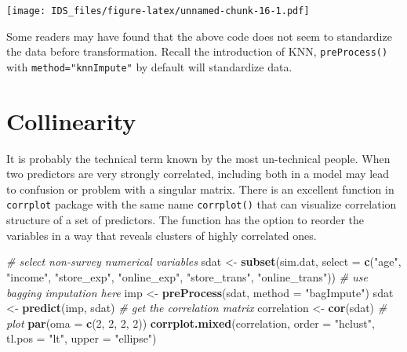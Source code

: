\documentclass[12pt,]{krantz}
\makeatletter
\newenvironment{Shaded}{\begin{snugshade}}{\end{snugshade}}
\newcommand{\CommentTok}[1]{\textcolor[rgb]{0.37,0.37,0.37}{\textit{#1}}}
\newcommand{\DataTypeTok}[1]{\textcolor[rgb]{0.27,0.27,0.27}{#1}}
\newcommand{\DecValTok}[1]{\textcolor[rgb]{0.06,0.06,0.06}{#1}}
\newcommand{\KeywordTok}[1]{\textcolor[rgb]{0.27,0.27,0.27}{\textbf{#1}}}
\newcommand{\NormalTok}[1]{#1}
\newcommand{\StringTok}[1]{\textcolor[rgb]{0.5,0.5,0.5}{#1}}
\newenvironment{kframe}{%
\medskip{}
\setlength{\fboxsep}{.8em}
 \def\at@end@of@kframe{}%
 \ifinner\ifhmode%
  \def\at@end@of@kframe{\end{minipage}}%
  \begin{minipage}{\columnwidth}%
 \fi\fi%
 \def\FrameCommand##1{\hskip\@totalleftmargin \hskip-\fboxsep
 \colorbox{shadecolor}{##1}\hskip-\fboxsep
     \hskip-\linewidth \hskip-\@totalleftmargin \hskip\columnwidth}%
 \MakeFramed {\advance\hsize-\width
   \@totalleftmargin\z@ \linewidth\hsize
   \@setminipage}}%
 {\par\unskip\endMakeFramed%
 \at@end@of@kframe}
\renewenvironment{Shaded}{\begin{kframe}}{\end{kframe}}
\makeatother
\begin{document}
\texttt{[image: IDS\_files/figure-latex/unnamed-chunk-16-1.pdf]}

Some readers may have found that the above code does not seem to standardize the data before transformation. Recall the introduction of KNN, \texttt{preProcess()} with \texttt{method="knnImpute"} by default will standardize data.

\hypertarget{collinearity}{%
\section{Collinearity}\label{collinearity}}

It is probably the technical term known by the most un-technical people. When two predictors are very strongly correlated, including both in a model may lead to confusion or problem with a singular matrix. There is an excellent function in \texttt{corrplot} package with the same name \texttt{corrplot()} that can visualize correlation structure of a set of predictors. The function has the option to reorder the variables in a way that reveals clusters of highly correlated ones.

\begin{Shaded}
\begin{Highlighting}[]
\CommentTok{# select non-survey numerical variables}
\NormalTok{sdat <-}\StringTok{ }\KeywordTok{subset}\NormalTok{(sim.dat, }\DataTypeTok{select =} \KeywordTok{c}\NormalTok{(}\StringTok{"age"}\NormalTok{, }\StringTok{"income"}\NormalTok{, }\StringTok{"store_exp"}\NormalTok{, }
    \StringTok{"online_exp"}\NormalTok{, }\StringTok{"store_trans"}\NormalTok{, }\StringTok{"online_trans"}\NormalTok{))}
\CommentTok{# use bagging imputation here}
\NormalTok{imp <-}\StringTok{ }\KeywordTok{preProcess}\NormalTok{(sdat, }\DataTypeTok{method =} \StringTok{"bagImpute"}\NormalTok{)}
\NormalTok{sdat <-}\StringTok{ }\KeywordTok{predict}\NormalTok{(imp, sdat)}
\CommentTok{# get the correlation matrix}
\NormalTok{correlation <-}\StringTok{ }\KeywordTok{cor}\NormalTok{(sdat)}
\CommentTok{# plot}
\KeywordTok{par}\NormalTok{(}\DataTypeTok{oma =} \KeywordTok{c}\NormalTok{(}\DecValTok{2}\NormalTok{, }\DecValTok{2}\NormalTok{, }\DecValTok{2}\NormalTok{, }\DecValTok{2}\NormalTok{))}
\KeywordTok{corrplot.mixed}\NormalTok{(correlation, }\DataTypeTok{order =} \StringTok{"hclust"}\NormalTok{, }\DataTypeTok{tl.pos =} \StringTok{"lt"}\NormalTok{, }
    \DataTypeTok{upper =} \StringTok{"ellipse"}\NormalTok{)}
\end{Highlighting}
\end{Shaded}
\end{document}
